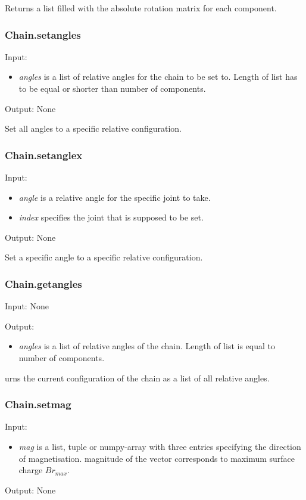 Returns a list filled with the absolute rotation matrix for each component.

\subsubsection{Chain.set\textunderscore angles}
Input:
\begin{itemize}
    \item \textit{angles} is a list of relative angles for the chain to be set to. Length of list has to be equal or shorter than number of components.
\end{itemize}
Output: None

Set all angles to a specific relative configuration.


\subsubsection{Chain.set\textunderscore anglex}
Input:
\begin{itemize}
    \item \textit{angle} is a relative angle for the specific joint to take.
    \item \textit{index} specifies the joint that is supposed to be set.
\end{itemize}
Output: None

Set a specific angle to a specific relative configuration.

\subsubsection{Chain.get\textunderscore angles}
Input: None

Output:
\begin{itemize}
    \item \textit{angles} is a list of relative angles of the chain. Length of list is equal to number of components.
\end{itemize}

urns the current configuration of the chain as a list of all relative angles.

\subsubsection{Chain.set\textunderscore mag}
Input:
\begin{itemize}
    \item \textit{mag} is a list, tuple or numpy-array with three entries specifying the direction of magnetisation. magnitude of the vector corresponds to maximum surface charge $Br_{max}$.
\end{itemize}
Output: None

